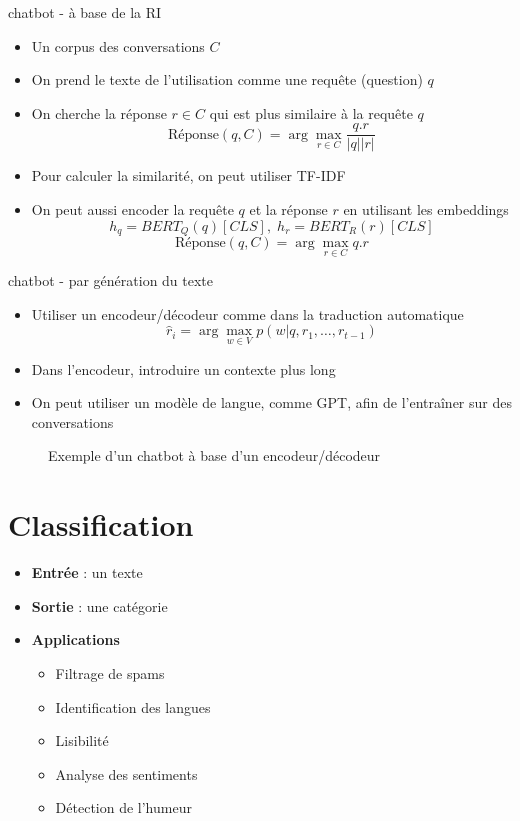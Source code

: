 \documentclass{KodeBook}
\begin{document}
chatbot - à base de la RI

\begin{itemize}
	\item Un corpus des conversations $C$
	\item On prend le texte de l'utilisation comme une requête (question) $q$
	\item On cherche la réponse $r \in C$ qui est plus similaire à la requête $q$
	\[\text{Réponse}(q, C) = \arg\max_{r \in C} \frac{q . r}{|q| |r|}\]
	\item Pour calculer la similarité, on peut utiliser TF-IDF
	\item On peut aussi encoder la requête $q$ et la réponse $r$ en utilisant les embeddings
	\[h_q = BERT_Q(q)[CLS],\; h_r = BERT_R(r)[CLS]\]
	\[\text{Réponse}(q, C) = \arg\max_{r \in C} q . r\]
\end{itemize}

chatbot - par génération du texte

\begin{itemize}
	\item Utiliser un encodeur/décodeur comme dans la traduction automatique
	\[ \hat{r}_i = \arg\max_{w \in V} p(w| q, r_1, \ldots, r_{t-1}) \]
	
	\item Dans l'encodeur, introduire un contexte plus long
	
	\item On peut utiliser un modèle de langue, comme GPT, afin de l'entraîner sur des conversations
\end{itemize}

\begin{figure}
	\centering
	\caption{Exemple d'un chatbot à base d'un encodeur/décodeur \cite{2020-jurafsky-martin}}
\end{figure}


\section{Classification}


\begin{itemize}
	\item \textbf{Entrée} : un texte
	\item \textbf{Sortie} : une catégorie
	\item \textbf{Applications} 
	\begin{itemize}
		\item Filtrage de spams
		\item Identification des langues
		\item Lisibilité 
		\item Analyse des sentiments
		\item Détection de l'humeur
	\end{itemize}
\end{itemize}
\end{document}
